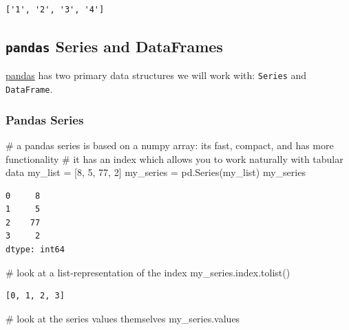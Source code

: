 \documentclass[
  letterpaper,
  DIV=11,
  numbers=noendperiod]{scrreprt}
\newenvironment{Shaded}{\begin{snugshade}}{\end{snugshade}}
\newcommand{\CommentTok}[1]{\textcolor[rgb]{0.37,0.37,0.37}{#1}}
\newcommand{\DecValTok}[1]{\textcolor[rgb]{0.68,0.00,0.00}{#1}}
\newcommand{\NormalTok}[1]{\textcolor[rgb]{0.00,0.23,0.31}{#1}}
\newcommand{\OperatorTok}[1]{\textcolor[rgb]{0.37,0.37,0.37}{#1}}
\begin{document}
\begin{verbatim}
['1', '2', '3', '4']
\end{verbatim}

\subsection{\texorpdfstring{\texttt{pandas} Series and
DataFrames}{pandas Series and DataFrames}}\label{pandas-series-and-dataframes}

\href{https://pandas.pydata.org/}{pandas} has two primary data
structures we will work with: \texttt{Series} and \texttt{DataFrame}.

\subsubsection{Pandas Series}\label{pandas-series}

\begin{Shaded}
\begin{Highlighting}[]
\CommentTok{\# a pandas series is based on a numpy array: it\textquotesingle{}s fast, compact, and has more functionality}
\CommentTok{\# it has an index which allows you to work naturally with tabular data}
\NormalTok{my\_list }\OperatorTok{=}\NormalTok{ [}\DecValTok{8}\NormalTok{, }\DecValTok{5}\NormalTok{, }\DecValTok{77}\NormalTok{, }\DecValTok{2}\NormalTok{]}
\NormalTok{my\_series }\OperatorTok{=}\NormalTok{ pd.Series(my\_list)}
\NormalTok{my\_series}
\end{Highlighting}
\end{Shaded}

\begin{verbatim}
0     8
1     5
2    77
3     2
dtype: int64
\end{verbatim}

\begin{Shaded}
\begin{Highlighting}[]
\CommentTok{\# look at a list{-}representation of the index}
\NormalTok{my\_series.index.tolist()}
\end{Highlighting}
\end{Shaded}

\begin{verbatim}
[0, 1, 2, 3]
\end{verbatim}

\begin{Shaded}
\begin{Highlighting}[]
\CommentTok{\# look at the series\textquotesingle{} values themselves}
\NormalTok{my\_series.values}
\end{Highlighting}
\end{Shaded}
\end{document}
